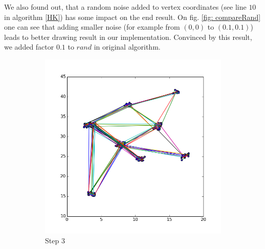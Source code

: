 \documentclass[12pt,a4paper]{article}
\begin{document}
\FloatBarrier 

We also found out, that a random noise added to vertex coordinates (see line $10$ in algorithm \ref{HK}) has some impact on the end result. On fig. \ref{fig: compareRand} one can see that adding smaller noise (for example from $(0,0)$ to $(0.1, 0.1)$) leads to better drawing result in our implementation. Convinced by this result, we added factor $0.1$ to $rand$ in original algorithm.

\begin{figure} [htb]
\begin{minipage}[0.2\textheight]{\textwidth}	%
	 \begin{subfigure}{0.5\textwidth}
		   \centering
           \includegraphics[scale=0.3]{results_Harel/rand1/HK_step3_eps1.png}
           \caption{Step $3$}
     \end{subfigure}
	 \begin{subfigure}{0.5\textwidth}
			\centering

\end{subfigure}
\end{minipage}
\end{figure}
\end{document}
